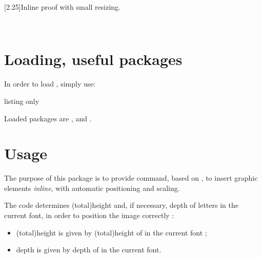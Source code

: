 \documentclass[11pt,a4paper]{ltxdoc}
\begin{document}
\begin{tcolorbox}[colframe=lightgray,colback=lightgray!5]
\scalebox{2.25}[2.25]{Inline  proof with small resizing.}
\end{tcolorbox}

\begin{tcolorbox}[colframe=lightgray,colback=lightgray!5]
\end{tcolorbox}

\vfill~

\vspace*{5mm}

\pagebreak


\hypertarget{matoc}{}

\tableofcontents

\vspace*{5mm}


\pagebreak

\section{Loading, useful packages}

In order to load , simply use:

\begin{DemoCode}{listing only}
\usepackage{inlinegraphicx}
\end{DemoCode}

Loaded packages are ,  and .

\section{Usage}

The purpose of this package is to provide command, based on , to insert graphic elements \textit{inline}, with automatic positioning and scaling.

\smallskip

The code determines (total)height and, if necessary, depth of letters in the current font, in order to position the image correctly :

\begin{itemize}
	\item (total)height is given by (total)height of {\setlength\fboxsep{0pt}} in the current font ;
	\item depth is given by depth of {\setlength\fboxsep{0pt}} in the current font.
\end{itemize}
\end{document}
